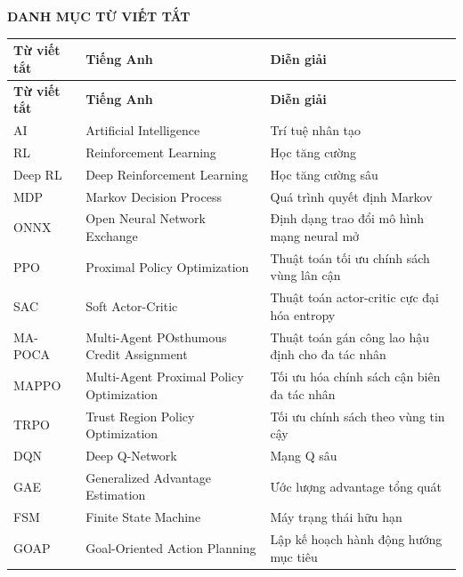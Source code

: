 \fontsize{13pt}{22.5pt}\selectfont
{}
{}
\begin{center}
    {\large\bfseries DANH MỤC TỪ VIẾT TẮT}
\end{center}

\vspace{0.5cm}

\begingroup
\tablefont
\renewcommand{\arraystretch}{1.4}
\noindent
\begin{longtable}{|>{\centering\arraybackslash}p{2.4cm}|p{4.5cm}|p{6.7cm}|}
\hline
\textbf{Từ viết tắt} & \textbf{Tiếng Anh} & \textbf{Diễn giải} \\
\hline
\endfirsthead
\hline
\textbf{Từ viết tắt} & \textbf{Tiếng Anh} & \textbf{Diễn giải} \\
\hline
\endhead
\hline
\endfoot
AI      & Artificial Intelligence & Trí tuệ nhân tạo \\ \hline
RL      & Reinforcement Learning & Học tăng cường \\ \hline
Deep RL & Deep Reinforcement Learning & Học tăng cường sâu \\ \hline
MDP     & Markov Decision Process & Quá trình quyết định Markov \\ \hline
ONNX    & Open Neural Network Exchange & Định dạng trao đổi mô hình mạng neural mở \\ \hline
PPO     & Proximal Policy Optimization & Thuật toán tối ưu chính sách vùng lân cận \\ \hline
SAC     & Soft Actor-Critic & Thuật toán actor-critic cực đại hóa entropy \\ \hline
MA-POCA & Multi-Agent POsthumous Credit Assignment & Thuật toán gán công lao hậu định cho đa tác nhân \\ \hline
MAPPO   & Multi-Agent Proximal Policy Optimization & Tối ưu hóa chính sách cận biên đa tác nhân \\ \hline
TRPO    & Trust Region Policy Optimization & Tối ưu chính sách theo vùng tin cậy \\ \hline
DQN     & Deep Q-Network & Mạng Q sâu \\ \hline
GAE     & Generalized Advantage Estimation & Ước lượng advantage tổng quát \\ \hline
FSM     & Finite State Machine & Máy trạng thái hữu hạn \\ \hline
GOAP    & Goal-Oriented Action Planning & Lập kế hoạch hành động hướng mục tiêu \\ \hline

\end{longtable}
